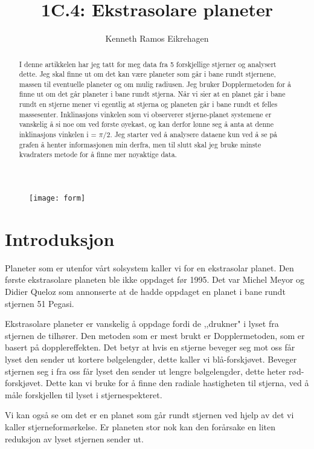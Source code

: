 \documentclass[12pt,preprint]{aastex6}
\begin{document}
\title{1C.4: Ekstrasolare planeter}

\author{Kenneth Ramos Eikrehagen}

\begin{figure}
\texttt{[image: form]}
\end{figure}

\newpage

\begin{abstract}
I denne artikkelen har jeg tatt for meg data fra 5 forskjellige stjerner og analysert dette. Jeg skal finne ut om det kan være planeter som går i bane rundt stjernene, massen til eventuelle planeter og om mulig radiusen. Jeg bruker Dopplermetoden for å finne ut om det går planeter i bane rundt stjerna. Når vi sier at en planet går i bane rundt en stjerne mener vi egentlig at stjerna og planeten går i bane rundt et felles massesenter. Inklinasjons vinkelen som vi observerer stjerne-planet systemene er vanskelig å si noe om ved første øyekast, og kan derfor lønne seg å anta at denne inklinasjons vinkelen i = $\pi/2$.  
Jeg starter ved å analysere dataene kun ved å se på grafen å henter informasjonen min derfra, men til slutt skal jeg bruke minste kvadraters metode for å finne mer nøyaktige data.
\end{abstract}

\section{Introduksjon}
\label{sect:intro}
Planeter som er utenfor vårt solsystem kaller vi for en ekstrasolar planet. Den første ekstrasolare planeten ble ikke oppdaget før 1995. Det var Michel Meyor og Didier Queloz som annonserte at de hadde oppdaget en planet i bane rundt stjernen 51 Pegasi. 

Ekstrasolare planeter er vanskelig å oppdage fordi de ,,drukner" i lyset fra stjernen de tilhører. Den metoden som er mest brukt er Dopplermetoden, som er basert på dopplereffekten. Det betyr at hvis en stjerne beveger seg mot oss får lyset den sender ut kortere bølgelengder, dette kaller vi blå-forskjøvet. Beveger stjernen seg i fra oss får lyset den sender ut lengre bølgelengder, dette heter rød-forskjøvet. Dette kan vi bruke for å finne den radiale hastigheten til stjerna, ved å måle forskjellen til lyset i stjernespekteret.

Vi kan også se om det er en planet som går rundt stjernen ved hjelp av det vi kaller stjerneformørkelse. Er planeten stor nok kan den forårsake en liten reduksjon av lyset stjernen sender ut. 
\end{document}
